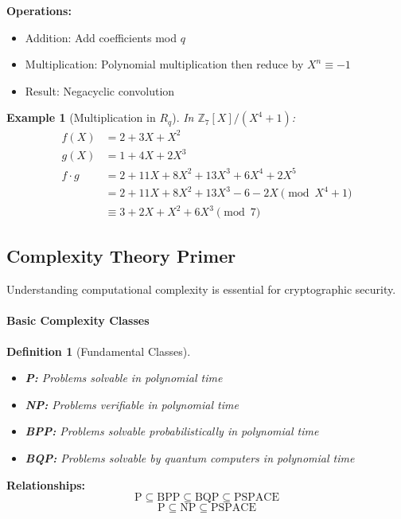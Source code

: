 \documentclass[11pt,a4paper]{article}
\newtheorem{definition}{Definition}
\newtheorem{example}{Example}
\begin{document}
\textbf{Operations:}
\begin{itemize}
    \item Addition: Add coefficients mod $q$
    \item Multiplication: Polynomial multiplication then reduce by $X^n \equiv -1$
    \item Result: Negacyclic convolution
\end{itemize}

\begin{example}[Multiplication in $R_q$]
In $\mathbb{Z}_7[X]/(X^4 + 1)$:
\begin{align}
f(X) &= 2 + 3X + X^2\\
g(X) &= 1 + 4X + 2X^3\\
f \cdot g &= 2 + 11X + 8X^2 + 13X^3 + 6X^4 + 2X^5\\
&= 2 + 11X + 8X^2 + 13X^3 - 6 - 2X \pmod{X^4 + 1}\\
&\equiv 3 + 2X + X^2 + 6X^3 \pmod{7}
\end{align}
\end{example}

\subsection{Complexity Theory Primer}
\label{app:complexity}

Understanding computational complexity is essential for cryptographic security.

\paragraph{Basic Complexity Classes}

\begin{definition}[Fundamental Classes]
\begin{itemize}
    \item \textbf{P:} Problems solvable in polynomial time
    \item \textbf{NP:} Problems verifiable in polynomial time
    \item \textbf{BPP:} Problems solvable probabilistically in polynomial time
    \item \textbf{BQP:} Problems solvable by quantum computers in polynomial time
\end{itemize}
\end{definition}

\textbf{Relationships:}
$$\text{P} \subseteq \text{BPP} \subseteq \text{BQP} \subseteq \text{PSPACE}$$
$$\text{P} \subseteq \text{NP} \subseteq \text{PSPACE}$$
\end{document}
